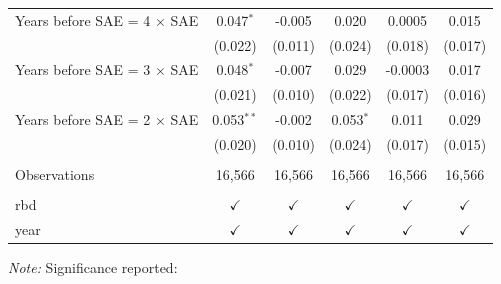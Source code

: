 \begin{table}[htbp]
{{\begin{tabular}{lccccc}
      Years before SAE = 4 $\times$ SAE      & 0.047$^{*}$   & -0.005        & 0.020         & 0.0005        & 0.015\\   
                                                           & (0.022)       & (0.011)       & (0.024)       & (0.018)       & (0.017)\\   
      Years before SAE = 3 $\times$ SAE      & 0.048$^{*}$   & -0.007        & 0.029         & -0.0003       & 0.017\\   
                                                           & (0.021)       & (0.010)       & (0.022)       & (0.017)       & (0.016)\\   
      Years before SAE = 2 $\times$ SAE      & 0.053$^{**}$  & -0.002        & 0.053$^{*}$   & 0.011         & 0.029\\   
                                                           & (0.020)       & (0.010)       & (0.024)       & (0.017)       & (0.015)\\   
       \\
      Observations                                         & 16,566        & 16,566        & 16,566        & 16,566        & 16,566\\  
       \\
      rbd                                                  & $\checkmark$  & $\checkmark$  & $\checkmark$  & $\checkmark$  & $\checkmark$\\   
      year                                                 & $\checkmark$  & $\checkmark$  & $\checkmark$  & $\checkmark$  & $\checkmark$\\   
      \bottomrule
   \end{tabular}
}}

\vspace{0.2cm}
{\footnotesize \emph{Note:} Significance reported:}
\end{table}

